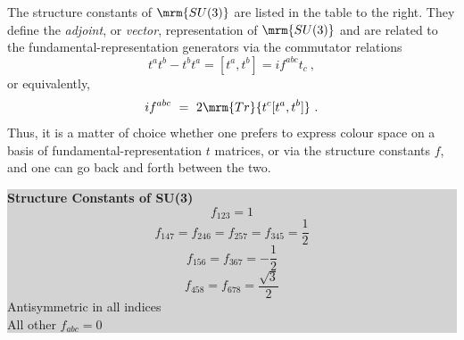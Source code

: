 \noindent\begin{minipage}[t]{0.46\textwidth}
The structure constants of $\mrm{SU(3)}$ are listed in the table to the
right. They define the \emph{adjoint}, or \emph{vector}, representation of $\mrm{SU(3)}$
and are related to the fundamental-representation generators via the
commutator relations
\begin{equation}
t^at^b - t^bt^a = [t^a,t^b] = i f^{abc} t_c~,
\end{equation} 
or equivalently,
\begin{equation}
if^{abc}~=~2\mrm{Tr}\{t^c[t^a,t^b]\}~.
\end{equation}
Thus, it is a matter of choice whether one prefers to express colour
space on a basis of fundamental-representation $t$ matrices, or via
the structure constants $f$, and one can go back and forth between the
two.
\end{minipage}%
\hfill%
\colorbox{darkgray}{%
\colorbox{lightgray}{%
\begin{minipage}[t]{0.46\textwidth}
\vspace*{3mm}\begin{center}
\textbf{Structure Constants of SU(3)}
\begin{equation}
f_{123} = 1
\end{equation}
\begin{equation}
f_{147} = f_{246} = f_{257} = f_{345} = \frac12
\end{equation}
\begin{equation}
f_{156} = f_{367} = -\frac12
\end{equation}
\begin{equation}
f_{458} = f_{678} = \frac{\sqrt{3}}{2}
\end{equation}
Antisymmetric in all indices\\[3mm]
All other $f_{abc}=0$\vspace*{3mm}\\
\end{center}
\end{minipage}%
}}\vskip1mm

